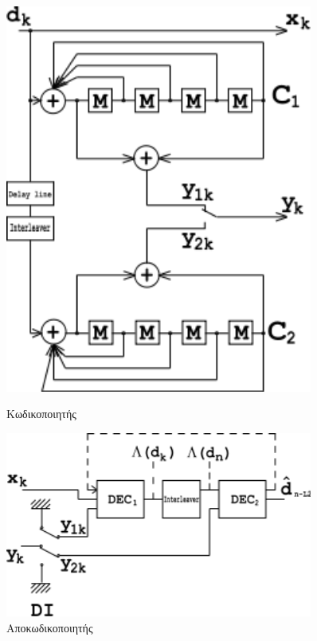 \begin{figure}[h]
    \centering
    \begin{minipage}{0.7\textwidth}
        \centering
        \includegraphics[width=0.9\textwidth]{figures/Turbo_encoder.png}
        \caption{Κωδικοποιητής }
    \end{minipage}\hfill
    \begin{minipage}{0.7\textwidth}
        \centering
        \includegraphics[width=0.9\textwidth]{figures/Turbo_decoder.png}
        \caption{Αποκωδικοποιητής }
    \end{minipage}
\end{figure}


